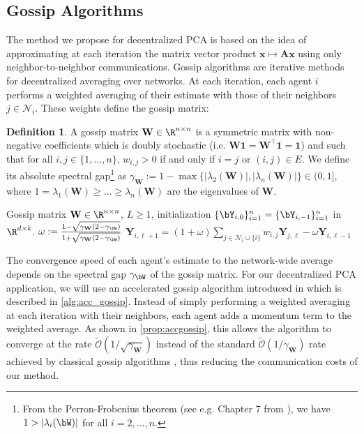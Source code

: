 \documentclass{article}
\theoremstyle{plain}
\theoremstyle{definition}
\newtheorem{definition}[theorem]{Definition}
\theoremstyle{remark}
\begin{document}
\subsection{Gossip Algorithms}

The method we propose for decentralized PCA is based on the idea of approximating at each iteration the matrix vector product $\bm{x} \mapsto \mathbf{A}\bm{x}$ using only neighbor-to-neighbor communications. Gossip algorithms \cite{boyd06} are iterative methods for decentralized averaging over networks. At each iteration, each agent $i$ performs a weighted averaging of their estimate with those of their neighbors $j\in\mathcal{N}_i$. These weights define the gossip matrix:

\begin{definition}\label{def:gossip}
  A gossip matrix $\mathbf{W} \in \R^{n\times n}$ is a symmetric matrix with non-negative coefficients which is doubly stochastic (i.e. $\mathbf{W}\mathbf{1} = \mathbf{W}^\top\mathbf{1}= \mathbf{1}$) and such that for all $i,j \in \{1,\dots,n\}$, $w_{i,j} > 0$ if and only if $i=j$ or $(i,j) \in E$. We define its absolute spectral gap\footnote{From the Perron-Frobenius theorem (see e.g. Chapter 7 from \citet{meyer23}), we have $1>\vert\lambda_i(\bW)\vert$ for all $i=2,\dots,n$.} as $ \gamma_\mathbf{W} := 1 - \max\{|\lambda_2(\mathbf{W})|, |\lambda_n(\mathbf{W})|\} \in (0,1]$, where $1 = \lambda_1(\mathbf{W}) \geqslant \dots \geqslant \lambda_n(\mathbf{W})$ are the eigenvalues of $\mathbf{W}$.
\end{definition}

\begin{algorithm}
    \caption{Accelerated Gossip}
    \label{alg:acc_gossip}
    \begin{algorithmic}[1]
        \REQUIRE Gossip matrix $\mathbf{W} \in \R^{n\times n}$, $L\geqslant 1$, initialization $\{\bY_{i,0}\}_{i=1}^n = \{\bY_{i,-1}\}_{i=1}^n$ in $\R^{d\times k}$.
        \STATE $\omega := \frac{1 - \sqrt{\gamma_\mathbf{W}(2-\gamma_\bW)}}{1 + \sqrt{\gamma_\mathbf{W}(2-\gamma_\bW)}}$
                \STATE $\mathbf{Y}_{i,\ell+1} = (1 + \omega) \sum_{j\in\mathcal{N}_i \cup \{i\}} w_{i,j} \mathbf{Y}_{j,\ell} - \omega \mathbf{Y}_{i,\ell-1}$
            \ENDFOR
        \ENDFOR
    \end{algorithmic}
\end{algorithm}


The convergence speed of each agent's estimate to the network-wide average depends on the spectral gap $\gamma_\bW$ of the gossip matrix. For our decentralized PCA application, we will use an accelerated gossip algorithm introduced in \cite{liu11} which is described in \cref{alg:acc_gossip}. Instead of simply performing a weighted averaging at each iteration with their neighbors, each agent adds a momentum term to the weighted average. As shown in \cref{prop:accgossip}, this allows the algorithm to converge at the rate $\tilde{\mathcal{O}}(1/\sqrt{\gamma_\mathbf{W}})$ instead of the standard $\tilde{\mathcal{O}}(1/\gamma_\mathbf{W})$ rate achieved by classical gossip algorithms \cite{boyd06}, thus reducing the communication costs of our method.
\end{document}
